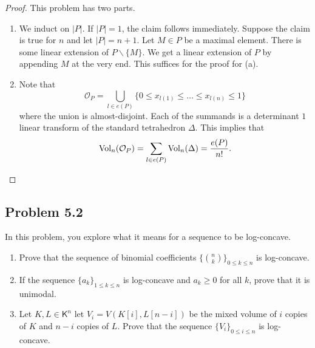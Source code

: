 \documentclass[12pt]{article}
\begin{document}
\begin{proof}
	This problem has two parts. 
	\begin{enumerate}[label = (\alph*)]
		\item We induct on $|P|$. If $|P| = 1$, the claim follows immediately. Suppose the claim is true for $n$ and let $|P| = n+1$. Let $M \in P$ be a maximal element. There is some linear extension of $P \backslash \{M\}$. We get a linear extension of $P$ by appending $M$ at the very end. This suffices for the proof for (a). 

		\item Note that 
		\[
			\mathcal{O}_P = \bigcup_{l \in e(P)} \{0 \leq x_{l(1)} \leq \ldots \leq x_{l(n)} \leq 1\}
		\]
		where the union is almost-disjoint. Each of the summands is a determinant $1$ linear transform of the standard tetrahedron $\Delta$. This implies that 
		\[
			\operatorname{Vol}_n(\mathcal{O}_P) = \sum_{l \in e(P)} \operatorname{Vol}_n(\Delta) = \frac{e(P)}{n!}. 
		\]
	\end{enumerate}
\end{proof}

\newpage 

\subsection{Problem 5.2}

\begin{problem} \label{problem-5.2}
	In this problem, you explore what it means for a sequence to be log-concave.
    \begin{enumerate}[label = (\alph*)]
        \item Prove that the sequence of binomial coefficients $\{\binom{n}{k}\}_{0 \leq k \leq n}$ is log-concave. 
        \item If the sequence $\{a_k\}_{1 \leq k \leq n}$ is log-concave and $a_k \geq 0$ for all $k$, prove that it is unimodal. 
        \item Let $K, L \in \mathsf{K}^n$ let $V_i = V(K[i], L[n-i])$ be the mixed volume of $i$ copies of $K$ and $n-i$ copies of $L$. Prove that the sequence $\{V_i\}_{0 \leq i \leq n}$ is log-concave. 
    \end{enumerate}
\end{problem}
\end{document}
